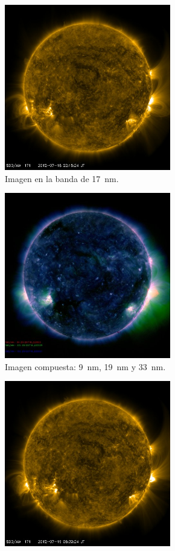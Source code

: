 \begin{figure}
        \centering
        \begin{subfigure}[b]{0.49\textwidth}
                \includegraphics[width=7.25cm]{sdo120718-2215-17}
                \caption*{Imagen en la banda de \SI{17}{\nano\metre}.}
        \end{subfigure}
        \begin{subfigure}[b]{0.49\textwidth}
                \includegraphics[width=7.25cm]{sdo120718-2229-c}
                \caption*{Imagen compuesta: \SI{9}{\nano\metre}, \SI{19}{\nano\metre} y \SI{33}{\nano\metre}.}
        \end{subfigure}
        \begin{subfigure}[b]{0.49\textwidth}
                \includegraphics[width=7.25cm]{sdo120719-0630-17}

\end{subfigure}
\end{figure}
